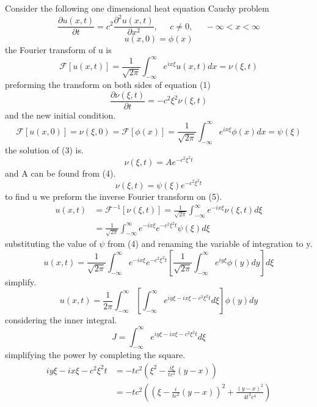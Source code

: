 \documentclass[]{article}
\begin{document}
Consider the following one dimensional heat equation Cauchy problem
\begin{equation}
\frac{\partial u(x,t)}{\partial t} = c^2\frac{\partial^2 u(x,t)}{\partial x^2}, \;\;\;\;\; c\neq0, \;\;\;\;\; -\infty < x< \infty
\end{equation}
\begin{equation}
u(x,0) = \phi (x)
\end{equation}
the Fourier transform of u is
\[
    \mathscr{F}[u(x,t)] = \frac{1}{\sqrt{2\pi}}\int_{-\infty}^{\infty}e^{ix\xi}u\left(x,t\right)dx= \nu\left(\xi,t\right)    
\]
preforming the transform on both sides of equation (1)
\begin{equation}
\frac{\partial\nu(\xi,t)}{\partial t} = -c^2 \xi^2 \nu(\xi,t)
\end{equation}
and the new initial condition.
\begin{equation}
\mathscr{F}[u(x,0)] = \nu(\xi,0) =\mathscr{F}[\phi(x)] = \frac{1}{\sqrt{2\pi}}\int_{-\infty}^{\infty}e^{ix\xi}\phi\left(x\right)dx = \psi(\xi)
\end{equation}
the solution of (3) is.
\[
    \nu(\xi,t) = Ae^{-c^2 \xi^2 t}    
\]
and A can be found from (4). 
\begin{equation}
\nu(\xi,t)= \psi(\xi)e^{-c^2 \xi^2 t}
\end{equation}
to find u we preform the inverse Fourier transform on (5).
\begin{align*}
u(x,t) &= \mathscr{F}^{-1}[\nu(\xi,t)] = \frac{1}{\sqrt{2\pi}}\int_{-\infty}^{\infty}e^{-ix\xi}\nu(\xi,t)d\xi
\\
&= \frac{1}{\sqrt{2\pi}}\int_{-\infty}^{\infty}e^{-ix\xi}e^{-c^2 \xi^2 t}\psi(\xi)d\xi
\end{align*}
substituting the value of $\psi$ from (4) and renaming the variable of integration to y.
\[
    u(x,t) = \frac{1}{\sqrt{2\pi}}\int_{-\infty}^{\infty}e^{-ix\xi}e^{-c^2 \xi^2 t}\left[\frac{1}{\sqrt{2\pi}}\int_{-\infty}^{\infty}e^{iy\xi}\phi\left(y\right)dy\right]d\xi    
\]
simplify.
\begin{equation}
u(x,t) = \frac{1}{2\pi}\int_{-\infty}^{\infty}\left[\int_{-\infty}^{\infty}e^{iy\xi -ix\xi - c^2 \xi^2 t} d\xi \right] \phi(y)dy
\end{equation}
considering the inner integral.
\begin{equation}
J = \int_{-\infty}^{\infty}e^{iy\xi -ix\xi - c^2 \xi^2 t} d\xi
\end{equation}
simplifying the power by completing the square.
\begin{align*}
iy\xi -ix\xi - c^2 \xi^2 t &= -tc^2\left(\xi^2-\frac{i\xi}{tc^2}(y-x)\right)
\\
&= -tc^2\left({(\xi-\frac{i}{tc^2}(y-x))}^2 + \frac{{(y-x)}^2}{4t^2 c^4}\right)
\end{align*}
\end{document}
